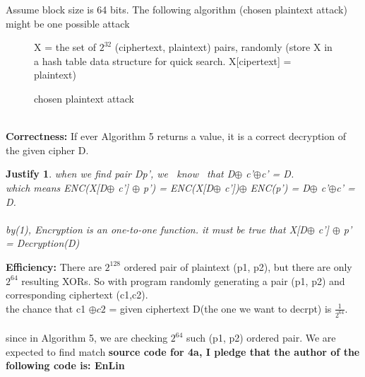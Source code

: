 \documentclass[12pt,letterpaper]{article}
\newtheorem*{justify}{Justify}
\begin{document}
Assume block size is 64 bits. The following algorithm (chosen plaintext attack) might be one possible attack
    \begin{figure}[ht]
      \centering
      \begin{minipage}{.7\linewidth}
        \begin{algorithm}[H]
        \SetAlgoLined
          X = the set of $2^{32}$ (ciphertext, plaintext) pairs, randomly\;
          (store X in a hash table data structure for quick search. X[cipertext] = plaintext)\;
         \caption{chosen plaintext attack}
        \end{algorithm}
      \end{minipage}
    \end{figure} \\
   \textbf{Correctness:} If ever Algorithm 5 returns a value, it is a correct decryption of the given cipher D. 
   \begin{justify}
     when we find pair D\oplus p', we \ know \ that D$\oplus$ c'$\oplus$c' = D.\\ which means ENC(X[D$\oplus$ c'] $\oplus$ p') = ENC(X[D$\oplus$ c'])$\oplus$ ENC(p') = D$\oplus$ c'$\oplus$c' = D.\\\\
     by(1), Encryption is an one-to-one function. it must be true that X[D$\oplus$ c'] $\oplus$ p' = Decryption(D)
   \end{justify}
   \textbf{Efficiency:} There are $2^{128}$ ordered pair of plaintext (p1, p2), but there are only $2^{64}$ resulting XORs.  So with program randomly generating a pair (p1, p2) and corresponding ciphertext (c1,c2).  \\ the chance that c1 $\oplus c2$ = given ciphertext D(the one we want to decrpt) is $\frac{1}{2^{64}}$.
   \\\\since in Algorithm 5, we are checking $2^{64}$ such (p1, p2) ordered pair.  We are expected to find match
  \clearpage
 \textbf{source code for 4a, I pledge that the author of the following code is: EnLin}
 \\
\end{document}
